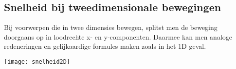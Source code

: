 \documentclass{ximera}
\begin{document}
\subsection*{Snelheid bij tweedimensionale bewegingen}

Bij voorwerpen die in twee dimensies bewegen, splitst men de beweging doorgaans op in loodrechte x- en y-componenten. Daarmee kan men analoge redeneringen en gelijkaardige formules maken zoals in het 1D geval.

\begin{image}
\texttt{[image: snelheid2D]}

\end{image}

	
\end{document}
